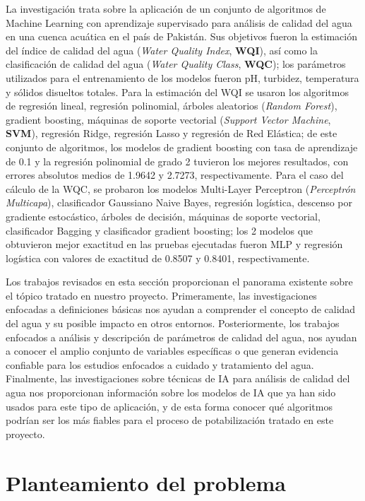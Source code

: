 La investigación \cite{waterQuality_Supervised_ML} trata sobre la aplicación de un conjunto de algoritmos de Machine Learning con aprendizaje supervisado para análisis de calidad del agua en una cuenca acuática en el país 
de Pakistán. Sus objetivos fueron la estimación del índice de calidad del agua (\textit{Water Quality Index}, \textbf{WQI}), así como la clasificación de calidad del agua (\textit{Water Quality Class}, \textbf{WQC}); los 
parámetros utilizados para el entrenamiento de los modelos fueron pH, turbidez, temperatura y sólidos disueltos totales. Para la estimación del WQI se usaron los algoritmos de regresión lineal, regresión polinomial, árboles 
aleatorios (\textit{Random Forest}), gradient boosting, máquinas de soporte vectorial (\textit{Support Vector Machine}, \textbf{SVM}), regresión Ridge, regresión Lasso y regresión de Red Elástica; de este conjunto de algoritmos,
los modelos de gradient boosting con tasa de aprendizaje de 0.1 y la regresión polinomial de grado 2 tuvieron los mejores resultados, con errores absolutos medios de 1.9642 y 2.7273, respectivamente. Para el caso del cálculo 
de la WQC, se probaron los modelos Multi-Layer Perceptron (\textit{Perceptrón Multicapa}), clasificador Gaussiano Naive Bayes, regresión logística, descenso por gradiente estocástico, árboles de decisión, máquinas de soporte 
vectorial, clasificador Bagging y clasificador gradient boosting; los 2 modelos que obtuvieron mejor exactitud en las pruebas ejecutadas fueron MLP y regresión logística con valores de exactitud de 0.8507 y 0.8401, respectivamente.  

Los trabajos revisados en esta sección proporcionan el panorama existente sobre el tópico tratado en nuestro proyecto. Primeramente, las investigaciones enfocadas a definiciones básicas nos ayudan a comprender el concepto 
de calidad del agua y su posible impacto en otros entornos. Posteriormente, los trabajos enfocados a análisis y descripción de parámetros de calidad del agua, nos ayudan a conocer el amplio conjunto de variables específicas o que 
generan evidencia confiable para los estudios enfocados a cuidado y tratamiento del agua. Finalmente, las investigaciones sobre técnicas de IA para análisis de calidad del agua nos proporcionan información sobre los modelos 
de IA que ya han sido usados para este tipo de aplicación, y de esta forma conocer qué algoritmos podrían ser los más fiables para el proceso de potabilización tratado en este proyecto. 

\section{Planteamiento del problema} \label{sec:SolProp}

